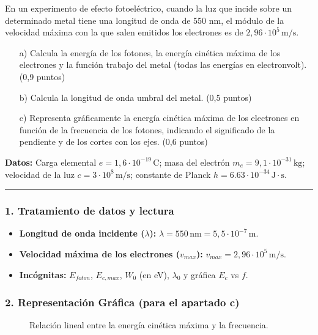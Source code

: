 \begin{cajaenunciado}
En un experimento de efecto fotoeléctrico, cuando la luz que incide sobre un determinado metal tiene una longitud de onda de 550 nm, el módulo de la velocidad máxima con la que salen emitidos los electrones es de $2,96\cdot10^{5}\,\text{m/s}$.
\begin{enumerate}
    \item[a)] Calcula la energía de los fotones, la energía cinética máxima de los electrones y la función trabajo del metal (todas las energías en electronvolt). (0,9 puntos)
    \item[b)] Calcula la longitud de onda umbral del metal. (0,5 puntos)
    \item[c)] Representa gráficamente la energía cinética máxima de los electrones en función de la frecuencia de los fotones, indicando el significado de la pendiente y de los cortes con los ejes. (0,6 puntos)
\end{enumerate}
\textbf{Datos:} Carga elemental $e=1,6\cdot10^{-19}\,\text{C}$; masa del electrón $m_{e}=9,1\cdot10^{-31}\,\text{kg}$; velocidad de la luz $c=3\cdot10^{8}\,\text{m/s}$; constante de Planck $h=6.63\cdot10^{-34}\,\text{J}\cdot\text{s}$.
\end{cajaenunciado}
\hrule

\subsubsection*{1. Tratamiento de datos y lectura}
\begin{itemize}
    \item \textbf{Longitud de onda incidente ($\lambda$):} $\lambda = 550\,\text{nm} = 5,5 \cdot 10^{-7}\,\text{m}$.
    \item \textbf{Velocidad máxima de los electrones ($v_{max}$):} $v_{max} = 2,96 \cdot 10^5\,\text{m/s}$.
    \item \textbf{Incógnitas:} $E_{foton}$, $E_{c,max}$, $W_0$ (en eV), $\lambda_0$ y gráfica $E_c$ vs $f$.
\end{itemize}

\subsubsection*{2. Representación Gráfica (para el apartado c)}
\begin{figure}[H]
    \centering
    \caption{Relación lineal entre la energía cinética máxima y la frecuencia.}
\end{figure}

